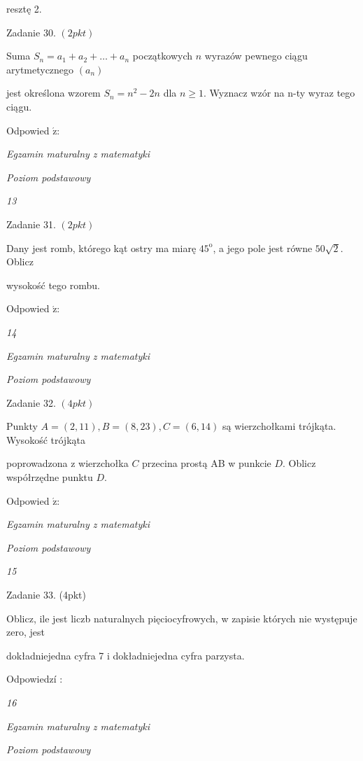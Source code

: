 \documentclass[a4paper,12pt]{article}
\begin{document}
resztę 2.

Zadanie 30. $(2pkt)$

Suma $S_{n}=a_{1}+a_{2}+\ldots+a_{n}$ początkowych $n$ wyrazów pewnego ciągu arytmetycznego $(a_{n})$

jest określona wzorem $S_{n}=n^{2}-2n$ dla $n\geq 1$. Wyznacz wzór na n-ty wyraz tego ciągu.

Odpowied $\acute{\mathrm{z}}$:





{\it Egzamin maturalny z matematyki}

{\it Poziom podstawowy}

{\it 13}

Zadanie 31. $(2pkt)$

Dany jest romb, którego kąt ostry ma miarę $45^{\mathrm{o}}$, a jego pole jest równe $50\sqrt{2}$. Oblicz

wysokość tego rombu.

Odpowied $\acute{\mathrm{z}}$:





{\it 14}

{\it Egzamin maturalny z matematyki}

{\it Poziom podstawowy}

Zadanie 32. $(4pkt)$

Punkty $A=(2,11), B=(8,23), C=(6,14)$ są wierzchołkami trójkąta. Wysokość trójkąta

poprowadzona z wierzchołka $C$ przecina prostą AB w punkcie $D$. Oblicz współrzędne punktu $D.$

Odpowied $\acute{\mathrm{z}}$:





{\it Egzamin maturalny z matematyki}

{\it Poziom podstawowy}

{\it 15}

Zadanie 33. (4pkt)

Oblicz, ile jest liczb naturalnych pięciocyfrowych, w zapisie których nie występuje zero, jest

dokładniejedna cyfra 7 i dokładniejedna cyfra parzysta.

Odpowiedzí :





{\it 16}

{\it Egzamin maturalny z matematyki}

{\it Poziom podstawowy}
\end{document}
